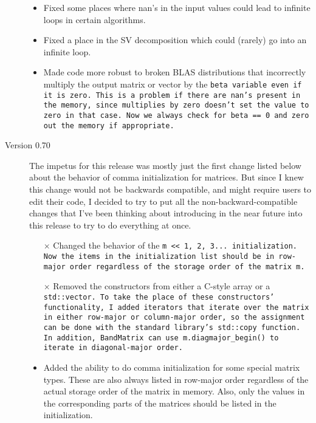 \begin{description}
\begin{itemize}
\item 
Fixed some places where nan's in the input values could lead to
infinite loops in certain algorithms. 

\item 
Fixed a place in the SV decomposition which could (rarely) go into an infinite loop.

\item 
Made code more robust to broken BLAS distributions that incorrectly multiply the output matrix or vector by the \tt{beta} variable even if it is zero.  This is a problem if there are \tt{nan}'s present in the memory, since multiplies by zero doesn't set the value to zero in that case.  Now we always check for \tt{beta == 0} and zero out the memory if appropriate.

\end{itemize}

\item[Version 0.70]

The impetus for this release was mostly just the first change listed below
about the behavior of comma initialization for matrices.  But since I knew
this change would not be backwards compatible, and might require users
to edit their code, I decided to try to put all the non-backward-compatible changes that I've been thinking about introducing in the near future into this
release to try to do everything at once. 

\begin{itemize}

\item[$\times$] 
Changed the behavior of the \tt{m << 1, 2, 3...} initialization.  Now the items in the initialization list should be in row-major order regardless of the storage order of the matrix \tt{m}.  

\item[$\times$] 
Removed the constructors from either a C-style array or a \tt{std::vector}.  
To take the place of these constructors' functionality, I added iterators that iterate over the matrix in either row-major or column-major order, so the assignment can be done with the standard library's \tt{std::copy} function.
In addition, \tt{BandMatrix} can use \tt{m.diagmajor\_begin()} to iterate in diagonal-major order.

\item 
Added the ability to do comma initialization for some special matrix types.  These are also always listed in row-major order regardless of the actual storage order of the matrix in memory.  Also, only the values in the corresponding parts of the matrices should be listed in the initialization. 


\end{itemize}
\end{description}
